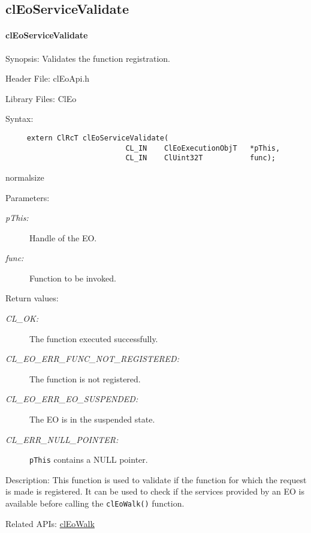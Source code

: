 \begin{flushleft}
  \newpage
\subsection{clEoServiceValidate}
\hypertarget{pageeo104}{}\paragraph{cl\-Eo\-Service\-Validate}\label{pageeo104}
\begin{Desc}
\item[Synopsis:]Validates the function registration.\end{Desc}
\begin{Desc}
\item[Header File:]clEoApi.h\end{Desc}
\begin{Desc}
\item[Library Files:]Cl\-Eo\end{Desc}
\begin{Desc}
\item[Syntax:]

\footnotesize\begin{verbatim}     extern ClRcT clEoServiceValidate(
                 			CL_IN    ClEoExecutionObjT   *pThis,
                 			CL_IN    ClUint32T           func);
\end{verbatim}
  normalsize
\end{Desc}
\begin{Desc}
\item[Parameters:]
\begin{description}
\item[{\em p\-This:}]Handle of the EO. 
\item[{\em func:}]Function to be invoked.\end{description}
\end{Desc}
\begin{Desc}
\item[Return values:]
\begin{description}
\item[{\em CL\_\-OK:}]The function executed successfully. 
\item[{\em CL\_\-EO\_\-ERR\_\-FUNC\_\-NOT\_\-REGISTERED:}]The function is not registered. 
\item[{\em CL\_\-EO\_\-ERR\_\-EO\_\-SUSPENDED:}]The EO is in the suspended state. 
\item[{\em CL\_\-ERR\_\-NULL\_\-POINTER:}]{\tt{pThis}} contains a NULL pointer.\end{description}
\end{Desc}
\begin{Desc}
\item[Description:]This function is used to validate if the function for which the request is made is registered. It can be used to check 
if the services provided by an EO is available before calling the {\tt{cl\-Eo\-Walk()}} function.\end{Desc}
\begin{Desc}
\item[Related APIs:]\hyperlink{pageeo103}{cl\-Eo\-Walk}\end{Desc}



\end{flushleft}
